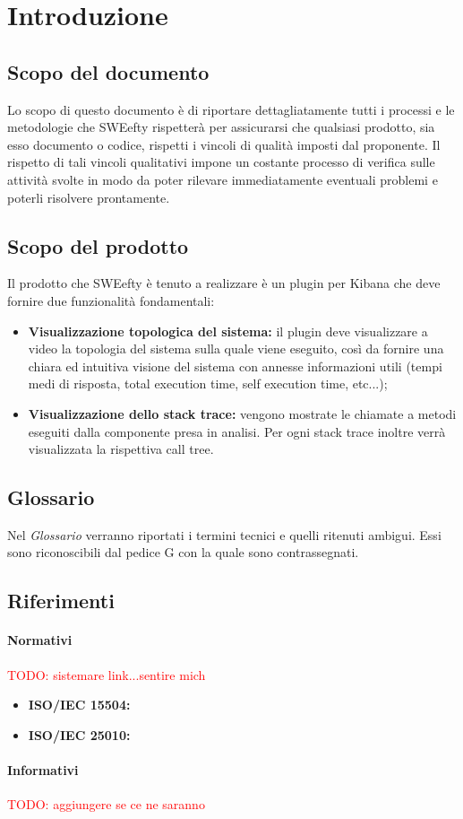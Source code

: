 \section{Introduzione}
	\subsection{Scopo del documento}
	Lo scopo di questo documento è di riportare dettagliatamente tutti i processi e le metodologie che SWEefty rispetterà per assicurarsi che qualsiasi prodotto, sia esso documento o codice, rispetti i vincoli di qualità imposti dal proponente.
	Il rispetto di tali vincoli qualitativi impone un costante processo di verifica sulle attività svolte in modo da poter rilevare immediatamente eventuali problemi e poterli risolvere prontamente.
	
	\subsection{Scopo del prodotto}
	Il prodotto che SWEefty è tenuto a  realizzare è un plugin per Kibana che deve fornire due funzionalità fondamentali:
	\begin{itemize}
		\item \textbf{Visualizzazione topologica del sistema:} il plugin deve visualizzare a video la topologia del sistema sulla quale viene eseguito, così da fornire una chiara ed intuitiva visione del sistema con annesse informazioni utili (tempi medi di risposta, total execution time, self execution time, etc...);
		\item \textbf{Visualizzazione dello stack trace:} vengono mostrate le chiamate a metodi eseguiti dalla componente presa in analisi. Per ogni stack trace inoltre verrà visualizzata la rispettiva call tree.
	\end{itemize}

	\subsection{Glossario}
	Nel \emph{Glossario} verranno riportati i termini tecnici e quelli ritenuti ambigui. Essi sono riconoscibili dal pedice G con la quale sono contrassegnati.
	\subsection{Riferimenti}
		\paragraph{Normativi}
		\textcolor{red}{TODO: sistemare link...sentire mich}
			\begin{itemize}
				\item \textbf{ISO/IEC 15504:}
				\item \textbf{ISO/IEC 25010:}
			\end{itemize}

		\paragraph{Informativi}
		\textcolor{red}{TODO: aggiungere se ce ne saranno}